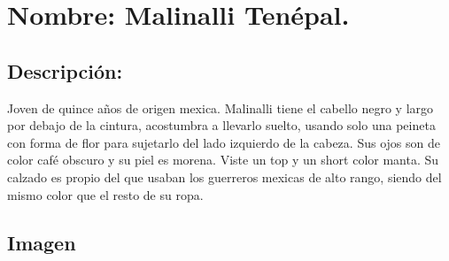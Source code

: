 \section{Nombre: Malinalli Tenépal.} \label{per:malinalli}
	\subsection{Descripción:}
Joven de quince años de origen mexica. Malinalli tiene el cabello negro y largo por debajo de la cintura, acostumbra a llevarlo suelto, usando solo una peineta con forma de flor para sujetarlo del lado izquierdo de la cabeza. Sus ojos son de color café obscuro y su piel es morena. Viste un top y un short color manta. Su calzado es propio del que usaban los guerreros mexicas de alto rango, siendo del mismo color que el resto de su ropa.   
\subsection{Imagen}

